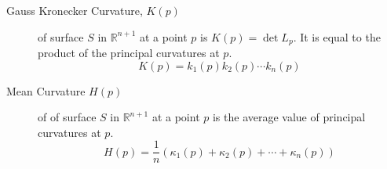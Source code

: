 \begin{description}
	\item[Gauss Kronecker Curvature, $K(p)$] of surface $S$ in $\mathbb{R}^{n+1}$ at a point $p$ is $K(p) = \det L_p$.
		It is equal to the product of the principal curvatures at $p$.
	\begin{equation}
		K(p) = k_1(p) k_2(p) \dotsm k_n(p)
	\end{equation}
\item[Mean Curvature $H(p)$] of of surface $S$ in $\mathbb{R}^{n+1}$ at a point $p$ is the average value of principal curvatures at $p$.
	\begin{equation}
		H(p) = \frac{1}{n} (\kappa_1(p) + \kappa_2(p) + \dotsb + \kappa_n(p))
	\end{equation}
\end{description}


